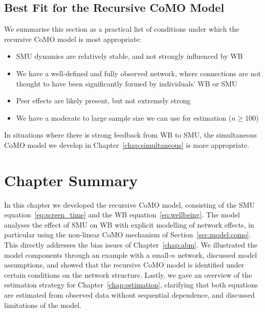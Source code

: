 \subsection{Best Fit for the Recursive CoMO Model}

We summarise this section as a practical list of conditions under which the recursive CoMO model is most appropriate:

\begin{itemize}
    \item SMU dynamics are relatively stable, and not strongly influenced by WB
    \item We have a well-defined and fully observed network, where connections are not thought to have been significantly formed by individuals' WB or SMU
    \item Peer effects are likely present, but not extremely strong
    \item We have a moderate to large sample size we can use for estimation ($n \geq 100$)
\end{itemize}

In situations where there is strong feedback from WB to SMU, the simultaneous CoMO model we develop in Chapter~\ref{chap:simultaneous} is more appropriate.


\section{Chapter Summary}
\label{sec:model:summary}
In this chapter we developed the recursive CoMO model, consisting of the SMU equation~\eqref{eq:screen_time} and the WB equation~\eqref{eq:wellbeing}. The model analyses the effect of SMU on WB with explicit modelling of network effects, in particular using the non-linear CoMO mechanism of Section~\ref{sec:model:como}. This directly addresses the bias issues of Chapter~\ref{chap:abm}. We illustrated the model components through an example with a small-$n$ network, discussed model assumptions, and showed that the recursive CoMO model is identified under certain conditions on the network structure. Lastly, we gave an overview of the estimation strategy for Chapter~\ref{chap:estimation}, clarifying that both equations are estimated from observed data without sequential dependence, and discussed limitations of the model.
